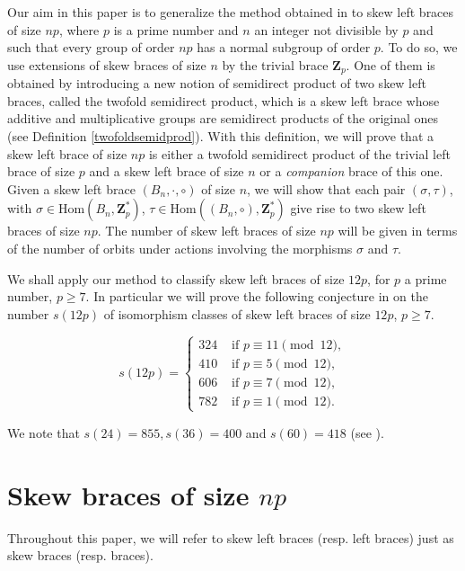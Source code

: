 \documentclass[12pt]{article}
\theoremstyle{definition}
\newcommand{\Z}{\mathbf Z}
\newcommand{\Hom}{\mathrm{Hom}}
\begin{document}
	Our aim in this paper is to generalize the method obtained in \cite{CGRV2} to skew left braces of size $np$, where $p$ is a prime number and $n$ an integer not divisible by $p$ and such that every group of order $np$ has a normal subgroup of order $p$. To do so, we use extensions of skew braces of size $n$ by the trivial brace $\Z_p$. One of them is obtained by introducing a new notion of semidirect product of two skew left braces, called the twofold semidirect product, which is a skew left brace whose additive and multiplicative groups are semidirect products of the original ones (see Definition \ref{twofoldsemidprod}). With this definition, we will prove that a skew left brace of size $np$ is either a twofold semidirect product of the trivial left brace of size $p$ and a skew left brace of size $n$ or a \emph{companion} brace of this one. Given a skew left brace $(B_n,\cdot,\circ)$ of size $n$, we will show that each pair $(\sigma,\tau)$, with $\sigma\in\Hom(B_n,\Z_p^*)$, $\tau\in\Hom((B_n,\circ),\Z_p^*)$ give rise to two skew left braces of size $np$. The number of skew left braces of size $np$ will be given in terms of the number of orbits under actions involving the morphisms $\sigma$ and $\tau$.
    
    
	We shall apply our method to classify skew left braces of size $12 p$, for $p$ a prime number, $p\geq 7$. In particular we will prove the following conjecture in \cite{BNY} on the number $s(12p)$ of isomorphism classes of skew left braces of size $12p$, $p\geq 7$.
	
	\begin{equation}\label{conjec}	
	s(12p)= \left\{ \begin{array}{ll} 324 & \text{\ if } p\equiv 11 \pmod{12}, \\
	410 & \text{\ if } p\equiv 5 \pmod{12}, \\
	606 & \text{\ if } p\equiv 7 \pmod{12}, \\
	782 & \text{\ if } p\equiv 1 \pmod{12}.
	\end{array} \right.
	\end{equation}
	
	\noindent
	We note that $s(24)=855, s(36)=400$ and $s(60)=418$ (see \cite[p. 21]{V}).
	
	\section{Skew braces of size $np$}\label{method}

    Throughout this paper, we will refer to skew left braces (resp. left braces) just as skew braces (resp. braces).
\end{document}
